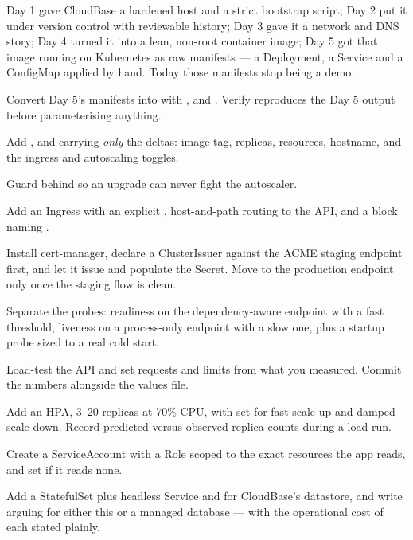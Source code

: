 Day 1 gave CloudBase a hardened host and a strict bootstrap script; Day 2 put it under version control with reviewable history; Day 3 gave it a network and DNS story; Day 4 turned it into a lean, non-root container image; Day 5 got that image running on Kubernetes as raw manifests --- a Deployment, a Service and a ConfigMap applied by hand. Today those manifests stop being a demo.

\begin{buildalong}
\begin{wbitem}
  \item Convert Day 5's manifests into  with ,  and . Verify  reproduces the Day 5 output before parameterising anything.
  \item Add ,  and  carrying \emph{only} the deltas: image tag, replicas, resources, hostname, and the ingress and autoscaling toggles.
  \item Guard  behind  so an upgrade can never fight the autoscaler.
  \item Add an Ingress with an explicit , host-and-path routing to the API, and a  block naming .
  \item Install cert-manager, declare a ClusterIssuer against the ACME staging endpoint first, and let it issue and populate the Secret. Move to the production endpoint only once the staging flow is clean.
  \item Separate the probes: readiness on the dependency-aware endpoint with a fast threshold, liveness on a process-only endpoint with a slow one, plus a startup probe sized to a real cold start.
  \item Load-test the API and set requests and limits from what you measured. Commit the numbers alongside the values file.
  \item Add an HPA, 3--20 replicas at 70\% CPU, with  set for fast scale-up and damped scale-down. Record predicted versus observed replica counts during a load run.
  \item Create a  ServiceAccount with a Role scoped to the exact resources the app reads, and set  if it reads none.
  \item Add a StatefulSet plus headless Service and  for CloudBase's datastore, and write  arguing for either this or a managed database --- with the operational cost of each stated plainly.

\end{wbitem}
\end{buildalong}
